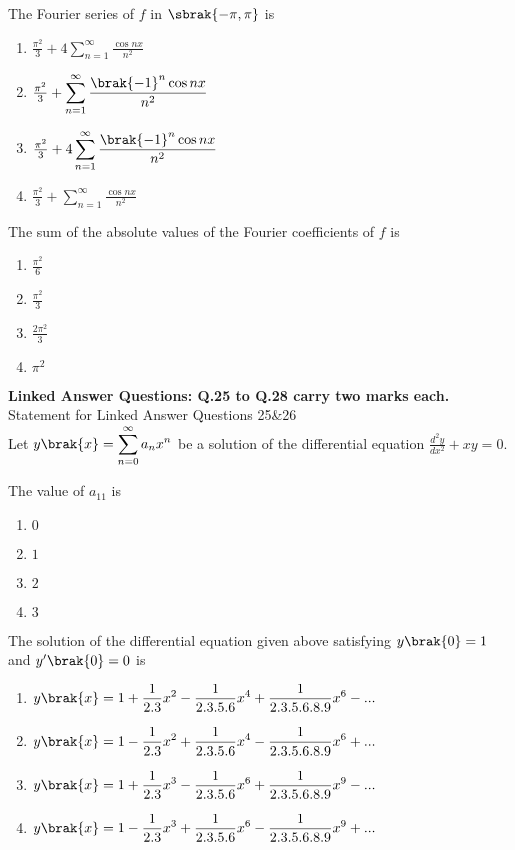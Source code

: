    \item The Fourier series of $f$ in $\sbrak{-\pi,\pi}$ is
    \begin{enumerate}
        \item $\frac{\pi^2}{3}+4\displaystyle \sum_{n=1}^{\infty}\frac{\cos{nx}}{n^2}$
        \item $\frac{\pi^2}{3}+\displaystyle \sum_{n=1}^{\infty}\frac{\brak{-1}^n\cos{nx}}{n^2}$
        \item $\frac{\pi^2}{3}+4\displaystyle \sum_{n=1}^{\infty}\frac{\brak{-1}^n\cos{nx}}{n^2}$
        \item $\frac{\pi^2}{3}+\displaystyle \sum_{n=1}^{\infty}\frac{\cos{nx}}{n^2}$
    \end{enumerate}
    \item The sum of the absolute values of the Fourier coefficients of $f$ is
    \begin{enumerate}
        \item $\displaystyle\frac{\pi^2}{6}$
        \item $\displaystyle\frac{\pi^2}{3}$
        \item $\displaystyle\frac{2\pi^2}{3}$
        \item $\displaystyle\pi^2$
    \end{enumerate}
    \textbf{Linked Answer Questions: Q.25 to Q.28 carry two marks each.}\\
    Statement for Linked Answer Questions 25\&26\\
    Let $y\brak{x}=\displaystyle \sum_{n=0}^{\infty}a_n x^n$ be a solution of the differential equation $\frac{d^2y}{dx^2}+xy=0$.\\
    \item The value of $a_11$ is
    \begin{enumerate}
        \item $0$
        \item $1$
        \item $2$
        \item $3$
    \end{enumerate}
    \item The solution of the differential equation given above satisfying $y\brak{0}=1$ and $y'\brak{0}=0$ is 
    \begin{enumerate}
        \item $\displaystyle y\brak{x}=1+\frac{1}{2.3}x^2-\frac{1}{2.3.5.6}x^4+\frac{1}{2.3.5.6.8.9}x^6-...$
        \item $\displaystyle y\brak{x}=1-\frac{1}{2.3}x^2+\frac{1}{2.3.5.6}x^4-\frac{1}{2.3.5.6.8.9}x^6+...$
        \item $\displaystyle y\brak{x}=1+\frac{1}{2.3}x^3-\frac{1}{2.3.5.6}x^6+\frac{1}{2.3.5.6.8.9}x^9-...$
        \item $\displaystyle y\brak{x}=1-\frac{1}{2.3}x^3+\frac{1}{2.3.5.6}x^6-\frac{1}{2.3.5.6.8.9}x^9+...$
    \end{enumerate}
